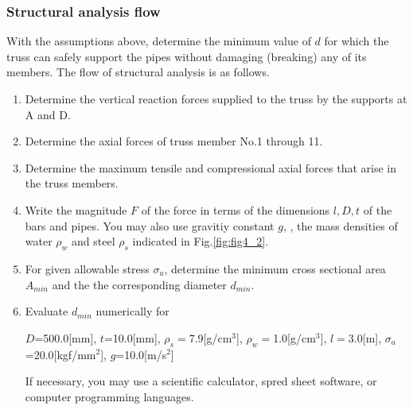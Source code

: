 \documentclass[10pt,a4j]{article}
\begin{document}
\subsubsection{Structural analysis flow}
With the assumptions above, determine the minimum value of $d$ for which the 
truss can safely support the pipes without damaging (breaking) any of its members. 
The flow of structural analysis is as follows.
\begin{enumerate}
\item
	Determine the vertical reaction forces supplied to the truss by the supports at A and D. 
\item
	Determine the axial forces of truss member No.1 through 11. 
\item
	Determine the maximum tensile and compressional axial forces that arise in the truss members. 
\item
	Write the magnitude $F$ of the force in terms of the dimensions 
	$l,D,t$ of the bars and pipes. You may also use gravitiy constant $g$, 
	, the mass densities of water $\rho_w$ and steel $\rho_s$ 
	indicated in Fig.\ref{fig:fig4_2}. 
\item
	For given allowable stress $\sigma_a$, determine the minimum cross sectional 
	area $A_{min}$ and the the corresponding diameter $d_{min}$. 
\item
	Evaluate $d_{min}$ numerically for\\
		\begin{center}
			$D$=500.0[mm], $t$=10.0[mm], 
			$\rho_s=$7.9[g/cm$^3$],
			$\rho_w=$1.0[g/cm$^3$],
			$l=3.0$[m],
			$\sigma_a$=20.0[kgf/mm$^2$], $g$=10.0[m/s$^2$]
		\end{center}
	If necessary, you may use a scientific calculator, spred sheet software, or computer programming languages. 
\end{enumerate}
\end{document}
